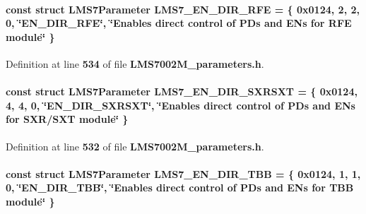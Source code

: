 \paragraph[{L\+M\+S7\+\_\+\+E\+N\+\_\+\+D\+I\+R\+\_\+\+R\+FE}]{\setlength{\rightskip}{0pt plus 5cm}const struct {\bf L\+M\+S7\+Parameter} L\+M\+S7\+\_\+\+E\+N\+\_\+\+D\+I\+R\+\_\+\+R\+FE = \{ 0x0124, 2, 2, 0, \char`\"{}\+E\+N\+\_\+\+D\+I\+R\+\_\+\+R\+F\+E\char`\"{}, \char`\"{}\+Enables direct control of P\+Ds and E\+Ns for R\+F\+E module\char`\"{} \}\hspace{0.3cm}{\ttfamily [static]}}\label{LMS7002M__parameters_8h_a27b47d5e63a32e97aae092b3227af8c8}


Definition at line {\bf 534} of file {\bf L\+M\+S7002\+M\+\_\+parameters.\+h}.

\paragraph[{L\+M\+S7\+\_\+\+E\+N\+\_\+\+D\+I\+R\+\_\+\+S\+X\+R\+S\+XT}]{\setlength{\rightskip}{0pt plus 5cm}const struct {\bf L\+M\+S7\+Parameter} L\+M\+S7\+\_\+\+E\+N\+\_\+\+D\+I\+R\+\_\+\+S\+X\+R\+S\+XT = \{ 0x0124, 4, 4, 0, \char`\"{}\+E\+N\+\_\+\+D\+I\+R\+\_\+\+S\+X\+R\+S\+X\+T\char`\"{}, \char`\"{}\+Enables direct control of P\+Ds and E\+Ns for S\+X\+R/\+S\+X\+T module\char`\"{} \}\hspace{0.3cm}{\ttfamily [static]}}\label{LMS7002M__parameters_8h_a5ba2c5bc9ac9d9402e1c5f08b300685f}


Definition at line {\bf 532} of file {\bf L\+M\+S7002\+M\+\_\+parameters.\+h}.

\paragraph[{L\+M\+S7\+\_\+\+E\+N\+\_\+\+D\+I\+R\+\_\+\+T\+BB}]{\setlength{\rightskip}{0pt plus 5cm}const struct {\bf L\+M\+S7\+Parameter} L\+M\+S7\+\_\+\+E\+N\+\_\+\+D\+I\+R\+\_\+\+T\+BB = \{ 0x0124, 1, 1, 0, \char`\"{}\+E\+N\+\_\+\+D\+I\+R\+\_\+\+T\+B\+B\char`\"{}, \char`\"{}\+Enables direct control of P\+Ds and E\+Ns for T\+B\+B module\char`\"{} \}\hspace{0.3cm}{\ttfamily [static]}}\label{LMS7002M__parameters_8h_ad90ba2aa483b2c98314c8c133a4e69f3}


